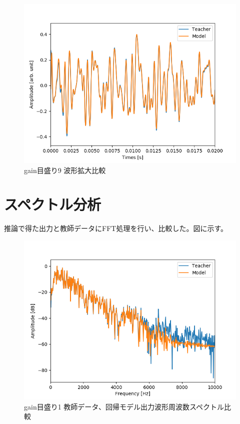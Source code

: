 \documentclass{jreport}		%
\begin{document}
\begin{figure}[htbp]
 \begin{center}
  \includegraphics[width=150mm]{gain10_output_hikaku.png}
 \end{center}
 \caption{gain目盛り9 波形拡大比較}
 \label{fig:one}
\end{figure}

\clearpage
\section{スペクトル分析}
推論で得た出力と教師データにFFT処理を行い、比較した。図に示す。

\begin{figure}[htbp]
 \begin{center}
  \includegraphics[width=150mm]{gain1_fft_hikaku.png}
 \end{center}
 \caption{gain目盛り1 教師データ、回帰モデル出力波形周波数スペクトル比較}
 \label{fig:one}
\end{figure}
\end{document}

